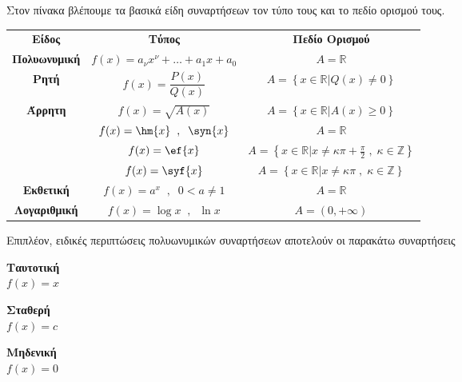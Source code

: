 \documentclass[twoside,11pt,a4paper,openany]{book}
\begin{document}
Στον πίνακα βλέπουμε τα βασικά είδη συναρτήσεων τον τύπο τους και το πεδίο ορισμού τους.
\begin{center}
\begin{longtable}{ccc}
\hline \rule[-2ex]{0pt}{5.5ex}\textbf{Είδος} & \textbf{Τύπος} & \textbf{Πεδίο Ορισμού} \\ 
\hhline{===} \rule[-2ex]{0pt}{5.5ex} \textbf{Πολυωνυμική} & $ f(x)=a_\nu x^\nu+\ldots+a_1x+a_0 $ & $ A=\mathbb{R} $ \\
\rule[-2ex]{0pt}{5.5ex} \textbf{Ρητή} & $ f(x)=\dfrac{P(x)}{Q(x)} $ & $ A=\left\lbrace\left.  x\in\mathbb{R}\right| Q(x)\neq0\right\rbrace $  \\
\rule[-2ex]{0pt}{5.5ex} \textbf{Άρρητη} & $ f(x)=\sqrt{A(x)} $ & $ A=\left\lbrace\left. x\in\mathbb{R}\right| A(x)\geq0\right\rbrace $ \\
\hhline{~--}\rule[-2ex]{0pt}{5.5ex} \multirow{5}{*}{\textbf{Τριγωνομετρική}} & $ f(x)=\hm{x}\;\;,\;\;\syn{x} $ & $ A=\mathbb{R} $ \\ 
\rule[-2ex]{0pt}{5.5ex}  & $ f(x)=\ef{x} $ & $ A=\left\lbrace\left.x\in\mathbb{R}\right| x\neq\kappa\pi+\frac{\pi}{2}\;,\;\kappa\in\mathbb{Z}\right\rbrace $ \\ 
\rule[-2ex]{0pt}{5.5ex}  & $ f(x)=\syf{x} $ & $ A=\left\lbrace\left.x\in\mathbb{R}\right| x\neq\kappa\pi\;,\;\kappa\in\mathbb{Z}\right\rbrace $ \\ 
\hhline{~--}\rule[-2ex]{0pt}{5.5ex} \textbf{Εκθετική} & $ f(x)=a^x\;\;,\;\;0<a\neq1 $ & $ A=\mathbb{R} $ \\ 
\rule[-2ex]{0pt}{5.5ex} \textbf{Λογαριθμική} & $ f(x)=\log{x}\;\;,\;\;\ln{x} $ & $ A=(0,+\infty) $ \\ 
\hline 
\end{longtable}
\end{center}
\vspace{-.8cm}
Επιπλέον, ειδικές περιπτώσεις πολυωνυμικών συναρτήσεων αποτελούν οι παρακάτω συναρτήσεις
\begin{center}
\begin{minipage}{2.5cm}
\textbf{Ταυτοτική}\\$ f(x)=x $
\end{minipage}\qquad
\begin{minipage}{2.5cm}
\textbf{Σταθερή}\\$ f(x)=c $
\end{minipage}\qquad
\begin{minipage}{2.5cm}
\textbf{Μηδενική}\\$ f(x)=0 $
\end{minipage}
\end{center}
\end{document}
